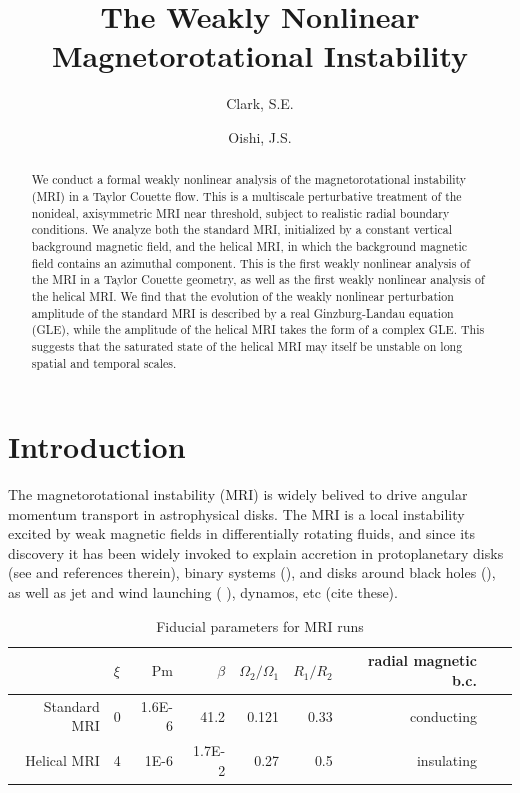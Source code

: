 \documentclass{emulateapj}
\newcommand{\citei}[1]{\citeauthor{#1} \citeyear{#1}}
\newcommand{\Pm}{\mathrm{Pm}}
\begin{document}
\title{The Weakly Nonlinear Magnetorotational Instability} %
\author{Clark, S.E.}
\author{Oishi, J.S. }


\begin{abstract}
We conduct a formal weakly nonlinear analysis of the magnetorotational instability (MRI) in a Taylor Couette flow. This is a multiscale perturbative treatment of the nonideal, axisymmetric MRI near threshold, subject to realistic radial boundary conditions. We analyze both the standard MRI, initialized by a constant vertical background magnetic field, and the helical MRI, in which the background magnetic field contains an azimuthal component. This is the first weakly nonlinear analysis of the MRI in a Taylor Couette geometry, as well as the first weakly nonlinear analysis of the helical MRI. We find that the evolution of the weakly nonlinear perturbation amplitude of the standard MRI is described by a real Ginzburg-Landau equation (GLE), while the amplitude of the helical MRI takes the form of a complex GLE. This suggests that the saturated state of the helical MRI may itself be unstable on long spatial and temporal scales.  
\end{abstract}

\section{Introduction}

The magnetorotational instability (MRI) is widely belived to drive angular momentum transport in astrophysical disks. The MRI is a local instability excited by weak magnetic fields in differentially rotating fluids, and since its discovery \citet{Balbus:1991vs} it has been widely invoked to explain accretion in protoplanetary disks (see \citei{Armitage:2010} and references therein), binary systems (), and disks around black holes (), as well as jet and wind launching (\citei{Lesur:2013}), dynamos, etc (cite these). 


\begin{table}[ht]
\normalsize
\caption{Fiducial parameters for MRI runs} \label{table:parameters}
\centering
\begin{tabular}{rlrrrrrrr}
  \hline
 & $\xi$ & $\Pm$ & $\beta$ & $\Omega_2/\Omega_1$ & $R_1/R_2$ & radial magnetic b.c. \\ 
  \hline\hline
Standard MRI & 0 & 1.6E-6 & 41.2 & 0.121 & 0.33 & conducting \\ 
Helical MRI & 4 & 1E-6 & 1.7E-2 & 0.27 & 0.5 & insulating\\ 
   \hline
\end{tabular}
\end{table} 
\end{document}
